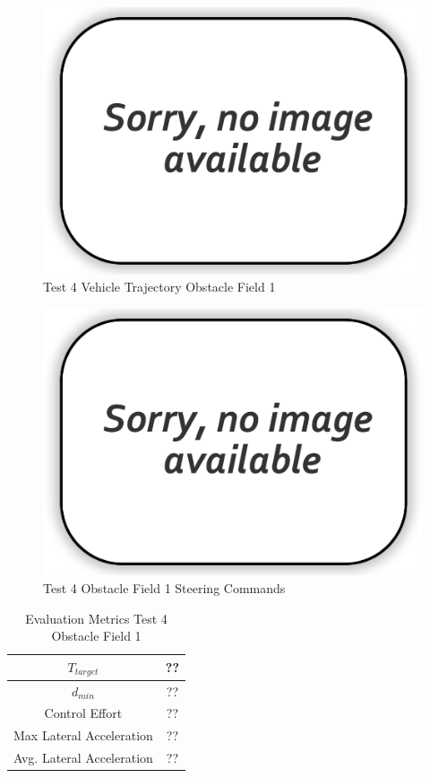 \documentclass[12pt,twocolumn]{article}
\begin{document}
\begin{figure}
	\centering
	\includegraphics[width=\columnwidth]{Figs/no-image.png}
	\caption{\small Test 4 Vehicle Trajectory Obstacle Field 1}  
	\label{fig:Test4_Obst1}
\end{figure}

\begin{figure}
	\centering
	\includegraphics[width=\columnwidth]{Figs/no-image.png}
	\caption{\small Test 4 Obstacle Field 1 Steering Commands}  
	\label{fig:Test4_Obst1_Steer}
\end{figure}

\begin{table}
\begin{center}
	\begin{tabular}{||c |c||} 
		\hline
		$T_{target}$ & ??\\ 
		\hline
		$d_{min}$ & ??\\
		\hline
		Control Effort & ??\\
		\hline
		Max Lateral Acceleration & ??\\
		\hline
		Avg. Lateral Acceleration & ??\\
		\hline
	\end{tabular}
\end{center}
\caption{Evaluation Metrics Test 4 Obstacle Field 1}
\label{t:EvalTest4Obst1}
\end{table}
\end{document}
